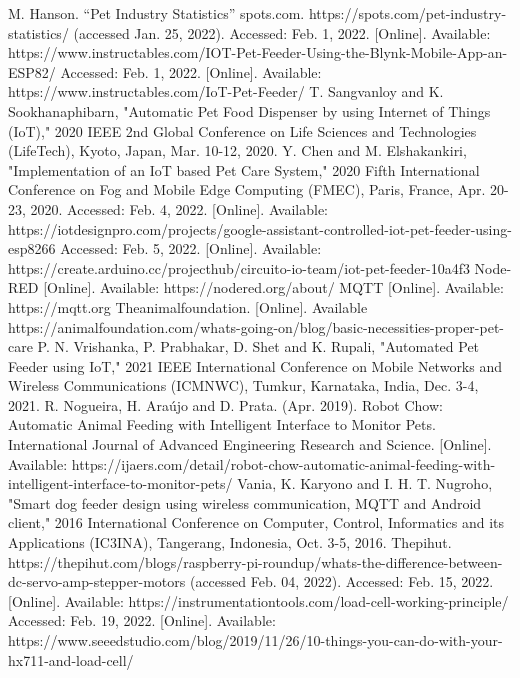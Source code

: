 \documentclass[conference]{IEEEtran}
\begin{document}
\begin{thebibliography}{00}
M.  Hanson.  “Pet  Industry  Statistics”  spots.com.  https://spots.com/pet-industry-statistics/ (accessed Jan. 25, 2022). 
Accessed: Feb. 1, 2022. [Online]. Available: https://www.instructables.com/IOT-Pet-Feeder-Using-the-Blynk-Mobile-App-an-ESP82/
Accessed: Feb. 1, 2022. [Online]. Available: https://www.instructables.com/IoT-Pet-Feeder/
T. Sangvanloy and K. Sookhanaphibarn, "Automatic Pet Food Dispenser by using Internet of Things (IoT)," 2020 IEEE 2nd Global Conference on Life Sciences and Technologies (LifeTech), Kyoto, Japan, Mar. 10-12, 2020.
Y. Chen and M. Elshakankiri, "Implementation of an IoT based Pet Care System," 2020 Fifth International Conference on Fog and Mobile Edge Computing (FMEC), Paris, France, Apr. 20-23, 2020.
Accessed: Feb. 4, 2022. [Online]. Available: https://iotdesignpro.com/projects/google-assistant-controlled-iot-pet-feeder-using-esp8266
Accessed: Feb. 5, 2022. [Online]. Available: https://create.arduino.cc/projecthub/circuito-io-team/iot-pet-feeder-10a4f3
Node-RED [Online]. Available: https://nodered.org/about/
MQTT [Online]. Available: https://mqtt.org
Theanimalfoundation. [Online]. Available https://animalfoundation.com/whats-going-on/blog/basic-necessities-proper-pet-care
P. N. Vrishanka, P. Prabhakar, D. Shet and K. Rupali, "Automated Pet Feeder using IoT," 2021 IEEE International Conference on Mobile Networks and Wireless Communications (ICMNWC), Tumkur, Karnataka, India, Dec. 3-4, 2021.
R. Nogueira, H. Araújo and D. Prata. (Apr. 2019). Robot Chow: Automatic Animal Feeding with Intelligent Interface to Monitor Pets. International Journal of Advanced Engineering Research and Science. [Online]. Available: https://ijaers.com/detail/robot-chow-automatic-animal-feeding-with-intelligent-interface-to-monitor-pets/
Vania, K. Karyono and I. H. T. Nugroho, "Smart dog feeder design using wireless communication, MQTT and Android client," 2016 International Conference on Computer, Control, Informatics and its Applications (IC3INA), Tangerang, Indonesia, Oct. 3-5, 2016.
Thepihut. https://thepihut.com/blogs/raspberry-pi-roundup/whats-the-difference-between-dc-servo-amp-stepper-motors (accessed Feb. 04, 2022).
Accessed: Feb. 15, 2022. [Online]. Available: https://instrumentationtools.com/load-cell-working-principle/
Accessed: Feb. 19, 2022. [Online]. Available: https://www.seeedstudio.com/blog/2019/11/26/10-things-you-can-do-with-your-hx711-and-load-cell/

\end{thebibliography}
\end{document}
